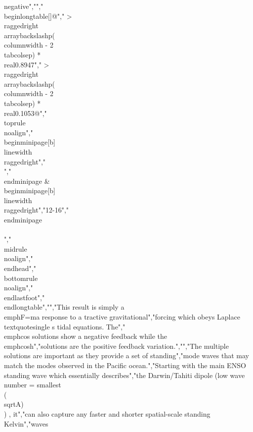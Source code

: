 {{{{{{{{{{negative","","\\begin{longtable}[]{@{}","  >{\\raggedright\\arraybackslash}p{(\\columnwidth - 2\\tabcolsep) * \\real{0.8947}}","  >{\\raggedright\\arraybackslash}p{(\\columnwidth - 2\\tabcolsep) * \\real{0.1053}}@{}}","\\toprule\\noalign{}","\\begin{minipage}[b]{\\linewidth}\\raggedright","\\[\\frac{\\partial v}{\\partial t} = \\cosh(\\sqrt{A}\\sum_{i = 1}^{i = N}{k_{i}\\sin(\\omega_{i}t)} + \\theta_{0})\\]","\\end{minipage} & \\begin{minipage}[b]{\\linewidth}\\raggedright","12-16","\\end{minipage} \\\\","\\midrule\\noalign{}","\\endhead","\\bottomrule\\noalign{}","\\endlastfoot","\\end{longtable}","","This result is simply a \\emph{F=ma} response to a tractive gravitational","forcing which obeys Laplace\\textquotesingle s tidal equations. The","\\emph{cos} solutions show a negative feedback while the \\emph{cosh}","solutions are the positive feedback variation.","","The multiple solutions are important as they provide a set of standing","mode waves that may match the modes observed in the Pacific ocean.","Starting with the main ENSO standing wave which essentially describes","the Darwin/Tahiti dipole (low wave number = smallest \\(\\sqrt{A})\\) , it","can also capture any faster and shorter spatial-scale standing Kelvin","waves }}}}}}}}}}

